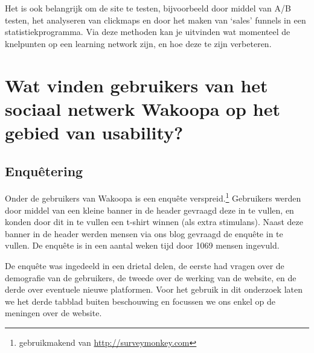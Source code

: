 \documentclass[a4paper, 10pt, pdftex]{report}
\begin{document}
    Het is ook belangrijk om de site te testen, bijvoorbeeld door middel van A/B testen, het analyseren van clickmaps en door het maken van `sales' funnels in een statistiekprogramma. Via deze methoden kan je uitvinden wat momenteel de knelpunten op een learning network zijn, en hoe deze te zijn verbeteren.


  \newpage
  \chapter{Wat vinden gebruikers van het sociaal netwerk Wakoopa op het gebied van usability?}
    \label{userchapter}
    \newpage
    \section{Enqu\^etering}
    Onder de gebruikers van Wakoopa is een enqu\^ete verspreid.\footnote{gebruikmakend van \url{http://surveymonkey.com}} Gebruikers werden door middel van een kleine banner in de header gevraagd deze in te vullen, en konden door dit in te vullen een t-shirt winnen (als extra stimulans). Naast deze banner in de header werden mensen via ons blog gevraagd de enqu\^ete in te vullen. De enqu\^ete is in een aantal weken tijd door 1069 mensen ingevuld.

    De enqu\^ete was ingedeeld in een drietal delen, de eerste had vragen over de demografie van de gebruikers, de tweede over de werking van de website, en de derde over eventuele nieuwe platformen. Voor het gebruik in dit onderzoek laten we het derde tabblad buiten beschouwing en focussen we ons enkel op de meningen over de website.
\end{document}
